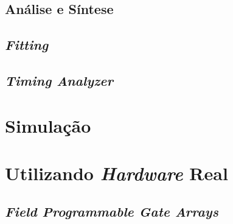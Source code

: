     \subsection{Análise e Síntese}
    {}

    \subsection{\textit{Fitting}}
    {}

    \subsection{\textit{Timing Analyzer}}
    {}

\section{Simulação}
{}

\section{Utilizando \textit{Hardware} Real}
{}

    \subsection{\textit{Field Programmable Gate Arrays}}
    {}


